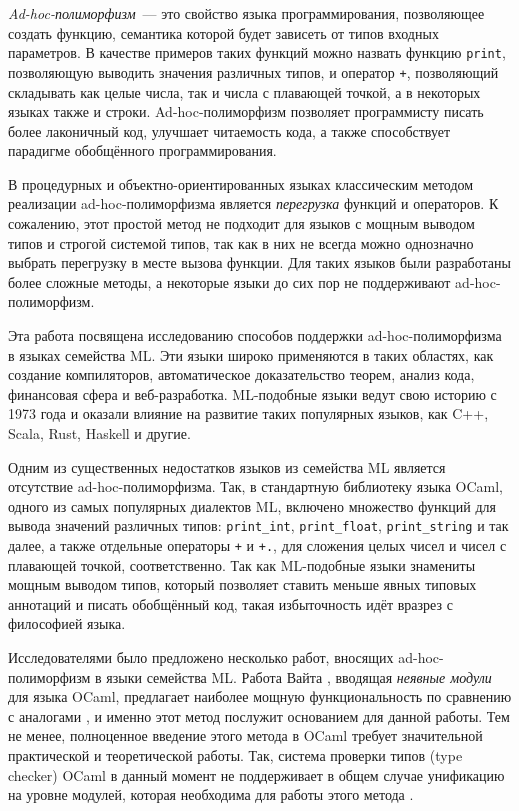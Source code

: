 \documentclass[../diploma.tex]{subfiles}
\begin{document}
 \label{sec:introduction}

\textit{Ad-hoc-полиморфизм}~--- это свойство языка программирования, позволяющее создать функцию, семантика которой будет зависеть от типов входных параметров. В качестве примеров таких функций можно назвать функцию \texttt{print}, позволяющую выводить значения различных типов, и оператор \texttt{+}, позволяющий складывать как целые числа, так и числа с плавающей точкой, а в некоторых языках также и строки. Ad-hoc-полиморфизм позволяет программисту писать более лаконичный код, улучшает читаемость кода, а также способствует парадигме обобщённого программирования.

В процедурных и объектно-ориентированных языках классическим методом реализации ad-hoc-полиморфизма является \textit{перегрузка} функций и операторов. К сожалению, этот простой метод не подходит для языков с мощным выводом типов и строгой системой типов, так как в них не всегда можно однозначно выбрать перегрузку в месте вызова функции. Для таких языков были разработаны более сложные методы, а некоторые языки до сих пор не поддерживают ad-hoc-полиморфизм.

Эта работа посвящена исследованию способов поддержки ad-hoc-полиморфизма в языках семейства ML. Эти языки широко применяются в таких областях, как создание компиляторов, автоматическое доказательство теорем, анализ кода, финансовая сфера и веб-разработка. ML-подобные языки ведут свою историю с 1973 года и оказали влияние на развитие таких популярных языков, как C++, Scala, Rust, Haskell и другие.

Одним из существенных недостатков языков из семейства ML является отсутствие ad-hoc-полиморфизма. Так, в стандартную библиотеку языка OCaml, одного из самых популярных диалектов ML, включено множество функций для вывода значений различных типов: \texttt{print_int}, \texttt{print_float}, \texttt{print_string} и так далее, а также отдельные операторы \texttt{+} и \texttt{+.}, для сложения целых чисел и чисел с плавающей точкой, соответственно. Так как ML-подобные языки знамениты мощным выводом типов, который позволяет ставить меньше явных типовых аннотаций и писать обобщённый код, такая избыточность идёт вразрез с философией языка.

Исследователями было предложено несколько работ, вносящих ad-hoc-полиморфизм в языки семейства ML. Работа Вайта \cite{white}, вводящая \textit{неявные модули} для языка OCaml, предлагает наиболее мощную функциональность по сравнению с аналогами \cite{ml_typeclasses} \cite{experiments} \cite{schneider}, и именно этот метод послужит основанием для данной работы. Тем не менее, полноценное введение этого метода в OCaml требует значительной практической и теоретической работы. Так, система проверки типов (type checker) OCaml в данный момент не поддерживает в общем случае унификацию на уровне модулей, которая необходима для работы этого метода \cite{discuss}.
\end{document}
